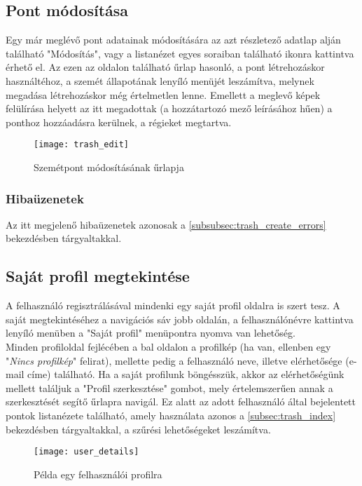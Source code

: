 \subsection{Pont módosítása}

Egy már meglévő pont adatainak módosítására az azt részletező adatlap alján található "Módosítás", vagy a listanézet egyes soraiban található  ikonra kattintva érhető el. Az ezen az oldalon található űrlap hasonló, a pont létrehozáskor használtéhoz, a szemét állapotának lenyíló menüjét leszámítva, melynek megadása létrehozáskor még értelmetlen lenne. Emellett a meglevő képek felülírása helyett az itt megadottak (a hozzátartozó mező leírásához hűen) a ponthoz hozzáadásra kerülnek, a régieket megtartva.

\begin{figure}[H]
	\centering
	\texttt{[image: trash\_edit]}
	\caption{Szemétpont módosításának űrlapja}
	\label{fig:trash_edit}
\end{figure}

\subsubsection{Hibaüzenetek}

Az itt megjelenő hibaüzenetek azonosak a \ref{subsubsec:trash_create_errors} bekezdésben tárgyaltakkal.

\subsection{Saját profil megtekintése}
\label{subsec:user_details}

A felhasználó regisztrálásával mindenki egy saját profil oldalra is szert tesz. A saját megtekintéséhez a navigációs sáv jobb oldalán, a felhasználónévre kattintva lenyíló menüben a "Saját profil" menüpontra nyomva van lehetőség.\\
Minden profiloldal fejlécében a bal oldalon a profilkép (ha van, ellenben egy "\textit{Nincs profilkép}" felirat), mellette pedig a felhasználó neve, illetve elérhetősége (e-mail címe) található. Ha a saját profilunk böngésszük, akkor az elérhetőségünk mellett találjuk a "Profil szerkesztése" gombot, mely értelemszerűen annak a szerkesztését segítő űrlapra navigál. Ez alatt az adott felhasználó által bejelentett pontok listanézete található, amely használata azonos a \ref{subsec:trash_index} bekezdésben tárgyaltakkal, a szűrési lehetőségeket leszámítva.

\begin{figure}[H]
	\centering
	\texttt{[image: user\_details]}
	\caption{Példa egy felhasználói profilra}
	\label{fig:user_details}
\end{figure}

